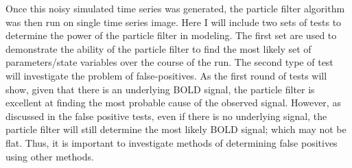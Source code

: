 Once this noisy simulated time series was generated, the particle filter algorithm
 was then run on single time series image. Here I will include two sets of tests 
to determine the power of the particle filter in modeling. The first set are 
used to demonstrate the ability of the particle filter to find the most likely
set of parameters/state variables over the course of the run. The second type
of test will investigate the problem of false-positives. As the first
round of tests will show, given that there is an underlying BOLD signal, 
the particle filter is excellent at finding the most probable cause of 
the observed signal. However, as discussed in the false positive tests,
even if there is no underlying signal, the particle filter will still determine
the most likely BOLD signal; which may not be flat. Thus, it is 
important to investigate methods of determining false positives using 
other methods. 


